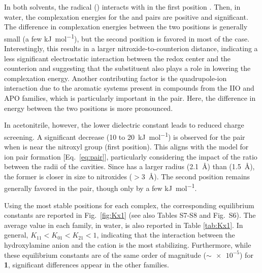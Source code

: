 \documentclass[review,preprint]{elsarticle}
\begin{document}
In both solvents, the radical () interacts with  in the first position \cite{zhangEffectHeteroatomFunctionality2018}. Then, in water, the complexation energies for the  and  pairs are positive and significant. The difference in complexation energies between the two positions is generally small (a few \si{\kilo\joule\per\mole}), but the second position is favored in most of the case. Interestingly, this results in a larger nitroxide-to-counterion distance, indicating a less significant electrostatic interaction between the redox center and the counterion and suggesting that the substituent also plays a role in lowering the complexation energy. Another contributing factor is the quadrupole-ion interaction due to the aromatic systems present in compounds from the IIO and APO families, which is particularly important in the  pair. Here, the difference in energy between the two positions is more pronounced.

In acetonitrile, however, the lower dielectric constant leads to reduced charge screening. A significant decrease (10 to \SI{20}{\kilo\joule\per\mole}) is observed for the  pair when  is near the nitroxyl group (first position). This aligns with the model for ion pair formation [Eq.~\eqref{eq:pair}], particularly considering the impact of the ratio between the radii of the cavities. Since  has a larger radius (\SI{2.1}{\angstrom}) than  (\SI{1.5}{\angstrom}), the former is closer in size to nitroxides ($>$\SI{3}{\angstrom}). The second position remains generally favored in the  pair, though only by a few \si{\kilo\joule\per\mole}.

Using the most stable positions for each complex, the corresponding equilibrium constants are reported in Fig.~\ref{fig:Kx1} (see also Tables S7-S8 and Fig.~S6). The average value in each family, in water, is also reported in Table \ref{tab:Kx1}. In general, $K_{11} < K_{01} < K_{21} < 1$, indicating that the interaction between the hydroxylamine anion and the cation is the most stabilizing. Furthermore, while these equilibrium constants are of the same order of magnitude ($\sim \num{e-5}$) for \textbf{1}, significant differences appear in the other families.
\end{document}
